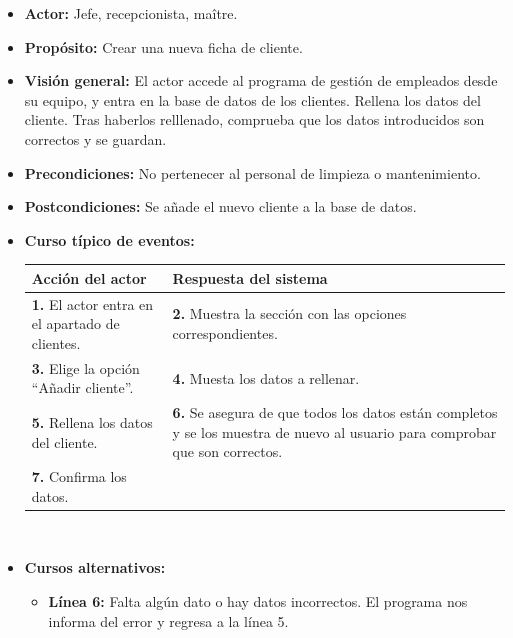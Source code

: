 \documentclass[spanish,a4paper,11pt, twoside]{report}	%
\begin{document}
			\begin{itemize}
			\item \textbf{Actor:} Jefe, recepcionista, maître.
			\item \textbf{Propósito:} Crear una nueva ficha de cliente.
			\item \textbf{Visión general:} El actor accede al programa de gestión de empleados desde su equipo, y entra en la base de datos de los clientes. Rellena  los datos del cliente.
			 Tras haberlos relllenado, comprueba que los datos introducidos son correctos y se guardan. 
			\item \textbf{Precondiciones:} No pertenecer al personal de limpieza o mantenimiento.
			\item \textbf{Postcondiciones:} Se añade el nuevo cliente a la base de datos.
			\item \textbf{Curso típico de eventos:} 	\\
				\begin{tabular}{|p{6cm}||p{6cm}|}
				\hline
				\textbf{Acción del actor} & \textbf{Respuesta del sistema} \\ \hline \hline
				\textbf{1.} El actor entra en el apartado de clientes. & 
				\textbf{2.} Muestra la sección  con las opciones correspondientes. \\ \hline
				\textbf{3.} Elige la opción ``Añadir cliente''.	& 
				\textbf{4.} Muesta los datos  a rellenar. \\ \hline
				\textbf{5.} Rellena  los datos del cliente. & 
				\textbf{6.} Se asegura de que todos los datos están completos y se 
					los muestra de nuevo al usuario para comprobar que son correctos.\\ \hline
				\textbf{7.} Confirma los datos. & \textbf{} \\ \hline
			\end{tabular}
			\\
			\item \textbf{Cursos alternativos:} 
			\begin{itemize}
				\item  \textbf{Línea 6:} Falta algún dato o hay datos incorrectos. El programa
					nos informa del error y regresa a la línea 5.
			\end {itemize}
		\end{itemize}


\end{document}
